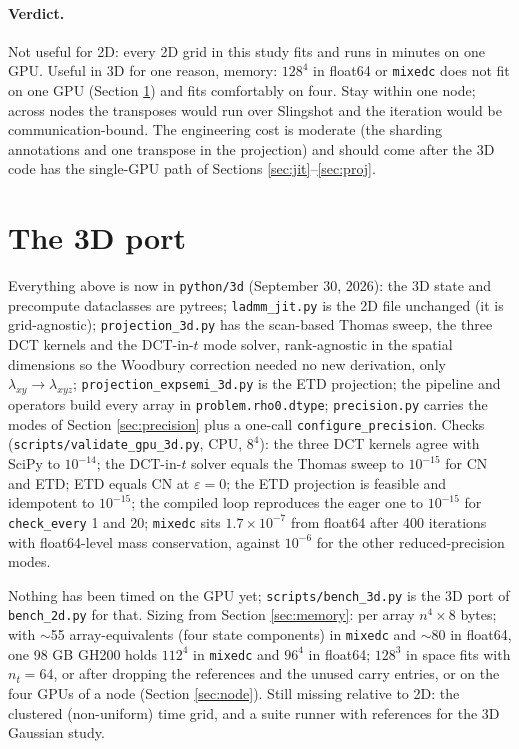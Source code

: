 \documentclass[11pt]{article}
\newcommand{\eps}{\varepsilon}
\newcommand{\code}[1]{\texttt{#1}}
\begin{document}
\paragraph{Verdict.} Not useful for 2D: every 2D grid in this study fits and runs
in minutes on one GPU. Useful in 3D for one reason, memory: $128^4$ in float64 or
\code{mixedc} does not fit on one GPU (Section \ref{sec:3d}) and fits comfortably on
four. Stay within one node; across nodes the transposes would run over Slingshot and
the iteration would be communication-bound. The engineering cost is moderate (the
sharding annotations and one transpose in the projection) and should come after the
3D code has the single-GPU path of Sections \ref{sec:jit}--\ref{sec:proj}.

\section{The 3D port}\label{sec:3d}

Everything above is now in \code{python/3d} (September 30, 2026): the 3D state and
precompute dataclasses are pytrees; \code{ladmm\_jit.py} is the 2D file unchanged (it is
grid-agnostic); \code{projection\_3d.py} has the scan-based Thomas sweep, the three DCT
kernels and the DCT-in-$t$ mode solver, rank-agnostic in the spatial dimensions so the
Woodbury correction needed no new derivation, only $\lambda_{xy}\to\lambda_{xyz}$;
\code{projection\_expsemi\_3d.py} is the ETD projection; the pipeline and operators build
every array in \code{problem.rho0.dtype}; \code{precision.py} carries the modes of Section
\ref{sec:precision} plus a one-call \code{configure\_precision}. Checks
(\code{scripts/validate\_gpu\_3d.py}, CPU, $8^4$): the three DCT kernels agree with SciPy to
$10^{-14}$; the DCT-in-$t$ solver equals the Thomas sweep to $10^{-15}$ for CN and ETD;
ETD equals CN at $\eps=0$; the ETD projection is feasible and idempotent to $10^{-15}$;
the compiled loop reproduces the eager one to $10^{-15}$ for \code{check\_every} 1 and 20;
\code{mixedc} sits $1.7\times10^{-7}$ from float64 after 400 iterations with float64-level
mass conservation, against $10^{-6}$ for the other reduced-precision modes.

Nothing has been timed on the GPU yet; \code{scripts/bench\_3d.py} is the 3D port of
\code{bench\_2d.py} for that. Sizing from Section \ref{sec:memory}: per array
$n^4\times 8$ bytes; with $\sim$55 array-equivalents (four state components) in
\code{mixedc} and $\sim$80 in float64, one 98 GB GH200 holds $112^4$ in \code{mixedc} and
$96^4$ in float64; $128^3$ in space fits with $n_t=64$, or after dropping the references
and the unused carry entries, or on the four GPUs of a node (Section \ref{sec:node}).
Still missing relative to 2D: the clustered (non-uniform) time grid, and a suite runner
with references for the 3D Gaussian study.
\end{document}
